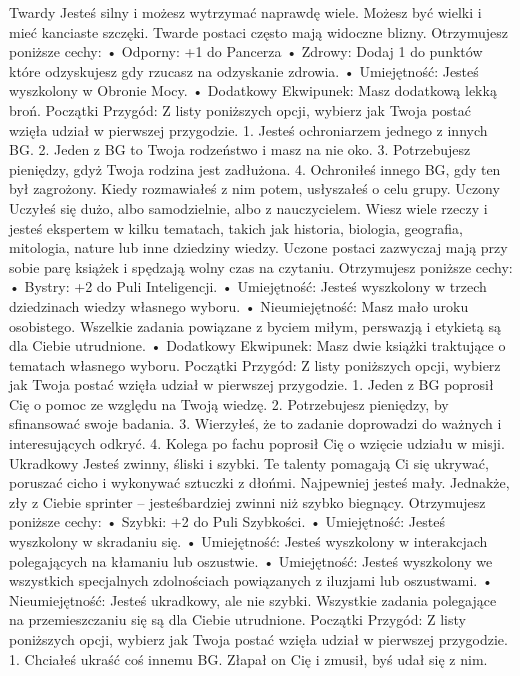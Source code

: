 Twardy
Jesteś silny i możesz wytrzymać naprawdę wiele. Możesz być wielki i mieć kanciaste szczęki. Twarde postaci często mają widoczne blizny.
Otrzymujesz poniższe cechy:
    • Odporny: +1 do Pancerza
    • Zdrowy: Dodaj 1 do punktów które odzyskujesz gdy rzucasz na odzyskanie zdrowia.
    • Umiejętność: Jesteś wyszkolony w Obronie Mocy.
    • Dodatkowy Ekwipunek: Masz dodatkową lekką broń.
Początki Przygód: Z listy poniższych opcji, wybierz jak Twoja postać wzięła udział w pierwszej przygodzie.
1. Jesteś ochroniarzem jednego z innych BG.
2. Jeden z BG to Twoja rodzeństwo i masz na nie oko.
3. Potrzebujesz pieniędzy, gdyż Twoja rodzina jest zadłużona.
4. Ochroniłeś innego BG, gdy ten był zagrożony. Kiedy rozmawiałeś z nim potem, usłyszałeś o celu grupy. 
Uczony
Uczyłeś się dużo, albo samodzielnie, albo z nauczycielem. Wiesz wiele rzeczy i jesteś ekspertem w kilku tematach, takich jak historia, biologia, geografia, mitologia, nature lub inne dziedziny wiedzy. Uczone postaci zazwyczaj mają przy sobie parę książek i spędzają wolny czas na czytaniu.
Otrzymujesz poniższe cechy:
    • Bystry: +2 do Puli Inteligencji.
    • Umiejętność: Jesteś wyszkolony w trzech dziedzinach wiedzy własnego wyboru.
    • Nieumiejętność: Masz mało uroku osobistego. Wszelkie zadania powiązane z byciem miłym, perswazją i etykietą są dla Ciebie utrudnione.
    • Dodatkowy Ekwipunek: Masz dwie książki traktujące o tematach własnego wyboru.
Początki Przygód: Z listy poniższych opcji, wybierz jak Twoja postać wzięła udział w pierwszej przygodzie.
1. Jeden z BG poprosił Cię o pomoc ze względu na Twoją wiedzę.
2. Potrzebujesz pieniędzy, by sfinansować swoje badania.
3. Wierzyłeś, że to zadanie doprowadzi do ważnych i interesujących odkryć.
4. Kolega po fachu poprosił Cię o wzięcie udziału w misji.
Ukradkowy
Jesteś zwinny, śliski i szybki. Te talenty pomagają Ci się ukrywać, poruszać cicho i wykonywać sztuczki z dłońmi. Najpewniej jesteś mały. Jednakże, zły z Ciebie sprinter – jesteśbardziej zwinni niż szybko biegnący.
Otrzymujesz poniższe cechy:
    • Szybki: +2 do Puli Szybkości.
    • Umiejętność: Jesteś wyszkolony w skradaniu się.
    • Umiejętność: Jesteś wyszkolony w interakcjach polegających na kłamaniu lub oszustwie.
    • Umiejętność: Jesteś wyszkolony we wszystkich specjalnych zdolnościach powiązanych z iluzjami lub oszustwami.
    • Nieumiejętność:  Jesteś ukradkowy, ale nie szybki. Wszystkie zadania polegające na przemieszczaniu się są dla Ciebie utrudnione. 
Początki Przygód: Z listy poniższych opcji, wybierz jak Twoja postać wzięła udział w pierwszej przygodzie.
1. Chciałeś ukraść coś innemu BG. Złapał on Cię i zmusił, byś udał się z nim.
